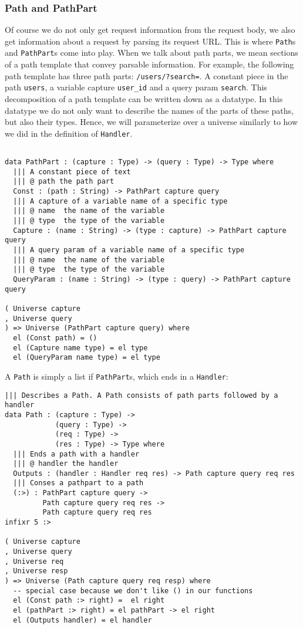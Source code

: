 \documentclass[12pt,a4paper]{article}
\begin{document}
\subsubsection{Path and PathPart}
Of course we do not only get request information from the request body,
we also get information about a request by parsing its request URL. This
is where \texttt{Path}s and \texttt{PathPart}s come into play. 
When we talk about path parts, we mean sections of a path template that convey parsable information.
For example, the following path template has three path parts: \texttt{/users/?search=}. A constant piece
in the path \texttt{users}, a variable capture \texttt{user\_id} and a query param \texttt{search}. This
decomposition of a path template can be written down as a datatype. In this datatype we do not only
want to describe the names of the parts of these paths, but also their types. Hence, we will parameterize
over a universe similarly to how we did in the definition of \texttt{Handler}.
\begin{verbatim}

data PathPart : (capture : Type) -> (query : Type) -> Type where
  ||| A constant piece of text
  ||| @ path the path part
  Const : (path : String) -> PathPart capture query
  ||| A capture of a variable name of a specific type
  ||| @ name  the name of the variable
  ||| @ type  the type of the variable
  Capture : (name : String) -> (type : capture) -> PathPart capture query
  ||| A query param of a variable name of a specific type
  ||| @ name  the name of the variable
  ||| @ type  the type of the variable
  QueryParam : (name : String) -> (type : query) -> PathPart capture query

( Universe capture
, Universe query
) => Universe (PathPart capture query) where
  el (Const path) = ()
  el (Capture name type) = el type
  el (QueryParam name type) = el type
\end{verbatim}

A \texttt{Path} is simply a list if \texttt{PathPart}s, which ends in a \texttt{Handler}:
\begin{verbatim}
||| Describes a Path. A Path consists of path parts followed by a handler
data Path : (capture : Type) -> 
            (query : Type) ->
            (req : Type) ->
            (res : Type) -> Type where
  ||| Ends a path with a handler
  ||| @ handler the handler
  Outputs : (handler : Handler req res) -> Path capture query req res
  ||| Conses a pathpart to a path
  (:>) : PathPart capture query ->
         Path capture query req res ->
         Path capture query req res
infixr 5 :>

( Universe capture
, Universe query
, Universe req
, Universe resp
) => Universe (Path capture query req resp) where
  -- special case because we don't like () in our functions
  el (Const path :> right) =  el right
  el (pathPart :> right) = el pathPart -> el right
  el (Outputs handler) = el handler
\end{verbatim}
\end{document}
